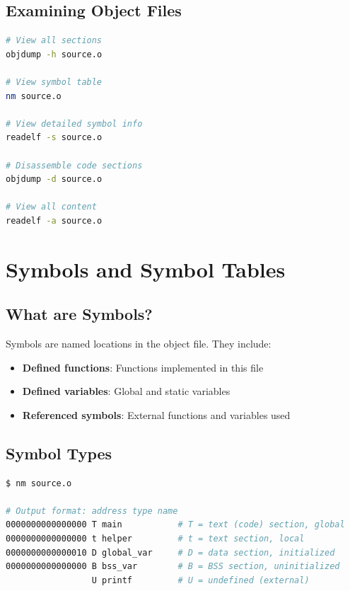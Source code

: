 \subsection{Examining Object Files}

\begin{lstlisting}[language=bash]
# View all sections
objdump -h source.o

# View symbol table
nm source.o

# View detailed symbol info
readelf -s source.o

# Disassemble code sections
objdump -d source.o

# View all content
readelf -a source.o
\end{lstlisting}

\section{Symbols and Symbol Tables}

\subsection{What are Symbols?}

Symbols are named locations in the object file. They include:
\begin{itemize}
    \item \textbf{Defined functions}: Functions implemented in this file
    \item \textbf{Defined variables}: Global and static variables
    \item \textbf{Referenced symbols}: External functions and variables used
\end{itemize}

\subsection{Symbol Types}

\begin{lstlisting}[language=bash]
$ nm source.o

# Output format: address type name
0000000000000000 T main           # T = text (code) section, global
0000000000000000 t helper         # t = text section, local
0000000000000010 D global_var     # D = data section, initialized
0000000000000000 B bss_var        # B = BSS section, uninitialized
                 U printf         # U = undefined (external)
\end{lstlisting}

